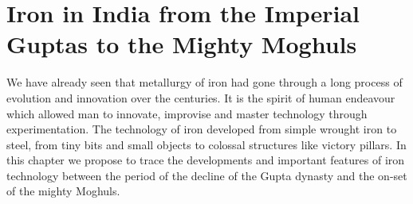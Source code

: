 \chapter{Iron in India from the Imperial Guptas to the Mighty Moghuls}\label{chapter5}


\vspace{-.3cm}

We have already seen that metallurgy of iron had gone through a long process of evolution and innovation over the centuries. It is the spirit of human endeavour which allowed man to innovate, improvise and master technology through experimentation. The technology of iron developed from simple wrought iron to steel, from tiny bits and small objects to colossal structures like victory pillars. In this chapter we propose to trace the developments and important features of iron technology between the period of the decline of the Gupta dynasty and the on-set of the mighty Moghuls. 

